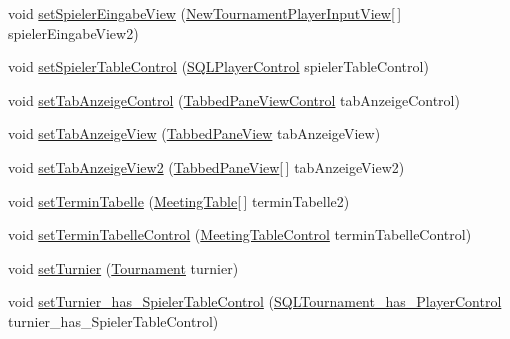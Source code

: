 \begin{DoxyCompactItemize}
void \hyperlink{classde_1_1turnierverwaltung_1_1control_1_1_main_control_a479708289ac916272930f5b1467ba3a1}{set\+Spieler\+Eingabe\+View} (\hyperlink{classde_1_1turnierverwaltung_1_1view_1_1_new_tournament_player_input_view}{New\+Tournament\+Player\+Input\+View}\mbox{[}$\,$\mbox{]} spieler\+Eingabe\+View2)
\item 
void \hyperlink{classde_1_1turnierverwaltung_1_1control_1_1_main_control_aa84db50b662f79a8d623c6e962c0f90b}{set\+Spieler\+Table\+Control} (\hyperlink{classde_1_1turnierverwaltung_1_1control_1_1_s_q_l_player_control}{S\+Q\+L\+Player\+Control} spieler\+Table\+Control)
\item 
void \hyperlink{classde_1_1turnierverwaltung_1_1control_1_1_main_control_a6aa37e6f23d64c41e625df08ee687010}{set\+Tab\+Anzeige\+Control} (\hyperlink{classde_1_1turnierverwaltung_1_1control_1_1_tabbed_pane_view_control}{Tabbed\+Pane\+View\+Control} tab\+Anzeige\+Control)
\item 
void \hyperlink{classde_1_1turnierverwaltung_1_1control_1_1_main_control_aaf88963d26ebd2c23e24c5c18a75555c}{set\+Tab\+Anzeige\+View} (\hyperlink{classde_1_1turnierverwaltung_1_1view_1_1_tabbed_pane_view}{Tabbed\+Pane\+View} tab\+Anzeige\+View)
\item 
void \hyperlink{classde_1_1turnierverwaltung_1_1control_1_1_main_control_a9dba920a4574f7861ec3ce1fcdd7ee06}{set\+Tab\+Anzeige\+View2} (\hyperlink{classde_1_1turnierverwaltung_1_1view_1_1_tabbed_pane_view}{Tabbed\+Pane\+View}\mbox{[}$\,$\mbox{]} tab\+Anzeige\+View2)
\item 
void \hyperlink{classde_1_1turnierverwaltung_1_1control_1_1_main_control_a80ab2f05c87514a22503155da920b7a7}{set\+Termin\+Tabelle} (\hyperlink{classde_1_1turnierverwaltung_1_1model_1_1_meeting_table}{Meeting\+Table}\mbox{[}$\,$\mbox{]} termin\+Tabelle2)
\item 
void \hyperlink{classde_1_1turnierverwaltung_1_1control_1_1_main_control_a9d06dcd1d742cd2f261843d9cce65670}{set\+Termin\+Tabelle\+Control} (\hyperlink{classde_1_1turnierverwaltung_1_1control_1_1_meeting_table_control}{Meeting\+Table\+Control} termin\+Tabelle\+Control)
\item 
void \hyperlink{classde_1_1turnierverwaltung_1_1control_1_1_main_control_ad205b79c102b7cb176f61395a77666b0}{set\+Turnier} (\hyperlink{classde_1_1turnierverwaltung_1_1model_1_1_tournament}{Tournament} turnier)
\item 
void \hyperlink{classde_1_1turnierverwaltung_1_1control_1_1_main_control_a9e325cfe4ab4c4e2af4e177863c06ecc}{set\+Turnier\+\_\+has\+\_\+\+Spieler\+Table\+Control} (\hyperlink{classde_1_1turnierverwaltung_1_1control_1_1_s_q_l_tournament__has___player_control}{S\+Q\+L\+Tournament\+\_\+has\+\_\+\+Player\+Control} turnier\+\_\+has\+\_\+\+Spieler\+Table\+Control)

\end{DoxyCompactItemize}
